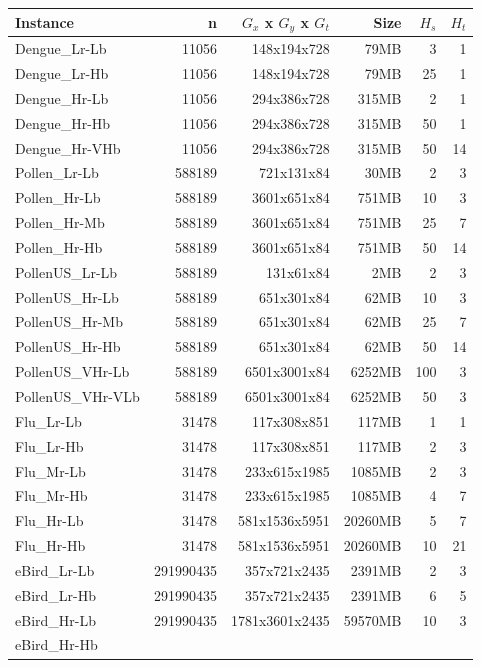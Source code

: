 \begin{tabular}{|l|rrr|rr|}
\hline
Instance & n & $G_x$ x $G_y$ x $G_t$ & Size & $H_s$ & $H_t$ \\
\hline
Dengue\_Lr-Lb & 11056 & 148x194x728 & 79MB & 3 & 1 \\
Dengue\_Lr-Hb & 11056 & 148x194x728 & 79MB & 25 & 1 \\
Dengue\_Hr-Lb & 11056 & 294x386x728 & 315MB & 2 & 1 \\
Dengue\_Hr-Hb & 11056 & 294x386x728 & 315MB & 50 & 1 \\
Dengue\_Hr-VHb & 11056 & 294x386x728 & 315MB & 50 & 14 \\
Pollen\_Lr-Lb & 588189 & 721x131x84 & 30MB & 2 & 3 \\
Pollen\_Hr-Lb & 588189 & 3601x651x84 & 751MB & 10 & 3 \\
Pollen\_Hr-Mb & 588189 & 3601x651x84 & 751MB & 25 & 7 \\
Pollen\_Hr-Hb & 588189 & 3601x651x84 & 751MB & 50 & 14 \\
PollenUS\_Lr-Lb & 588189 & 131x61x84 & 2MB & 2 & 3 \\
PollenUS\_Hr-Lb & 588189 & 651x301x84 & 62MB & 10 & 3 \\
PollenUS\_Hr-Mb & 588189 & 651x301x84 & 62MB & 25 & 7 \\
PollenUS\_Hr-Hb & 588189 & 651x301x84 & 62MB & 50 & 14 \\
PollenUS\_VHr-Lb & 588189 & 6501x3001x84 & 6252MB & 100 & 3 \\
PollenUS\_VHr-VLb & 588189 & 6501x3001x84 & 6252MB & 50 & 3 \\
Flu\_Lr-Lb & 31478 & 117x308x851 & 117MB & 1 & 1 \\
Flu\_Lr-Hb & 31478 & 117x308x851 & 117MB & 2 & 3 \\
Flu\_Mr-Lb & 31478 & 233x615x1985 & 1085MB & 2 & 3 \\
Flu\_Mr-Hb & 31478 & 233x615x1985 & 1085MB & 4 & 7 \\
Flu\_Hr-Lb & 31478 & 581x1536x5951 & 20260MB & 5 & 7 \\
Flu\_Hr-Hb & 31478 & 581x1536x5951 & 20260MB & 10 & 21 \\
eBird\_Lr-Lb & 291990435 & 357x721x2435 & 2391MB & 2 & 3 \\
eBird\_Lr-Hb & 291990435 & 357x721x2435 & 2391MB & 6 & 5 \\
eBird\_Hr-Lb & 291990435 & 1781x3601x2435 & 59570MB & 10 & 3 \\
eBird\_Hr-Hb & & & & & \\
\hline
\end{tabular}
